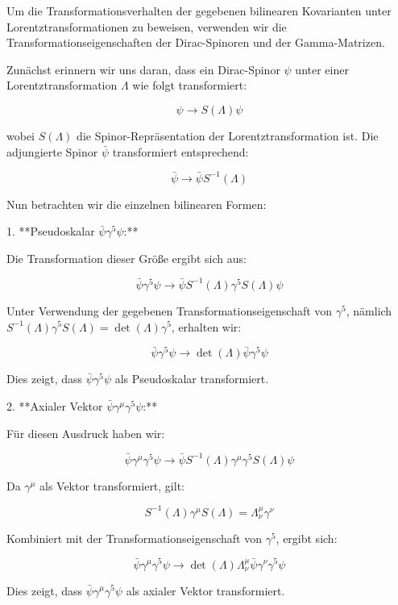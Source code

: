 Um die Transformationsverhalten der gegebenen bilinearen Kovarianten unter Lorentztransformationen zu beweisen, verwenden wir die Transformationseigenschaften der Dirac-Spinoren und der Gamma-Matrizen.

Zunächst erinnern wir uns daran, dass ein Dirac-Spinor $\psi$ unter einer Lorentztransformation $\Lambda$ wie folgt transformiert:

\[
\psi \rightarrow S(\Lambda) \psi
\]

wobei $S(\Lambda)$ die Spinor-Repräsentation der Lorentztransformation ist. Die adjungierte Spinor $\bar{\psi}$ transformiert entsprechend:

\[
\bar{\psi} \rightarrow \bar{\psi} S^{-1}(\Lambda)
\]

Nun betrachten wir die einzelnen bilinearen Formen:

1. **Pseudoskalar $\bar{\psi} \gamma^5 \psi$:**

Die Transformation dieser Größe ergibt sich aus:

\[
\bar{\psi} \gamma^5 \psi \rightarrow \bar{\psi} S^{-1}(\Lambda) \gamma^5 S(\Lambda) \psi
\]

Unter Verwendung der gegebenen Transformationseigenschaft von $\gamma^5$, nämlich $S^{-1}(\Lambda) \gamma^5 S(\Lambda) = \operatorname{det}(\Lambda) \gamma^5$, erhalten wir:

\[
\bar{\psi} \gamma^5 \psi \rightarrow \operatorname{det}(\Lambda) \bar{\psi} \gamma^5 \psi
\]

Dies zeigt, dass $\bar{\psi} \gamma^5 \psi$ als Pseudoskalar transformiert.

2. **Axialer Vektor $\bar{\psi} \gamma^\mu \gamma^5 \psi$:**

Für diesen Ausdruck haben wir:

\[
\bar{\psi} \gamma^\mu \gamma^5 \psi \rightarrow \bar{\psi} S^{-1}(\Lambda) \gamma^\mu \gamma^5 S(\Lambda) \psi
\]

Da $\gamma^\mu$ als Vektor transformiert, gilt:

\[
S^{-1}(\Lambda) \gamma^\mu S(\Lambda) = \Lambda_\nu^\mu \gamma^\nu
\]

Kombiniert mit der Transformationseigenschaft von $\gamma^5$, ergibt sich:

\[
\bar{\psi} \gamma^\mu \gamma^5 \psi \rightarrow \operatorname{det}(\Lambda) \Lambda_\nu^\mu \bar{\psi} \gamma^\nu \gamma^5 \psi
\]

Dies zeigt, dass $\bar{\psi} \gamma^\mu \gamma^5 \psi$ als axialer Vektor transformiert.

